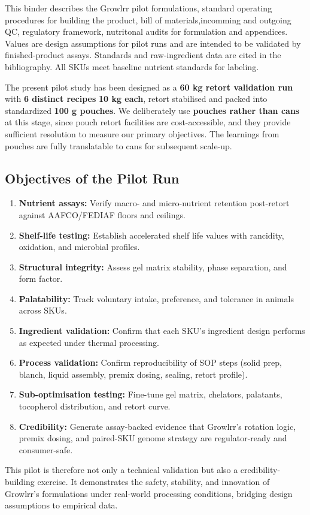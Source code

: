 
This binder describes the Growlrr pilot formulations, standard operating procedures for building the product, bill of materials,incomming and outgoing QC, regulatory framework, nutritonal audits for formulation and appendices. Values are design assumptions for pilot runs and are intended to be validated by finished-product assays. Standards and raw-ingredient data are cited in the bibliography. All SKUs meet baseline nutrient standards for labeling.

The present pilot study has been designed as a \textbf{60 kg retort validation run} with \textbf{6 distinct recipes}
\textbf{10 kg each}, retort stabilised and packed into standardized \textbf{100 g pouches}. We deliberately use \textbf{pouches rather than cans} at this stage, since pouch retort facilities are cost-accessible, and they provide sufficient resolution to measure our primary objectives. The learnings from pouches are fully translatable to cans for subsequent scale-up.

\subsection*{Objectives of the Pilot Run}
\begin{enumerate}[leftmargin=1.5em]
  \item \textbf{Nutrient assays:} Verify macro- and micro-nutrient retention post-retort against AAFCO/FEDIAF floors and ceilings.
  \item \textbf{Shelf-life testing:} Establish accelerated shelf life values with rancidity, oxidation, and microbial profiles.
  \item \textbf{Structural integrity:} Assess gel matrix stability, phase separation, and form factor.
  \item \textbf{Palatability:} Track voluntary intake, preference, and tolerance in animals across SKUs.
  \item \textbf{Ingredient validation:} Confirm that each SKU's ingredient design performs as expected under thermal processing.
  \item \textbf{Process validation:} Confirm reproducibility of SOP steps (solid prep, blanch, liquid assembly, premix dosing, sealing, retort profile).
  \item \textbf{Sub-optimisation testing:} Fine-tune gel matrix, chelators, palatants, tocopherol distribution, and retort curve.
  \item \textbf{Credibility:} Generate assay-backed evidence that Growlrr's rotation logic, premix dosing, and paired-SKU genome strategy are regulator-ready and consumer-safe.
\end{enumerate}

This pilot is therefore not only a technical validation but also a credibility-building exercise. It demonstrates the safety, stability, and innovation of Growlrr's formulations under real-world processing conditions, bridging design assumptions to empirical data.